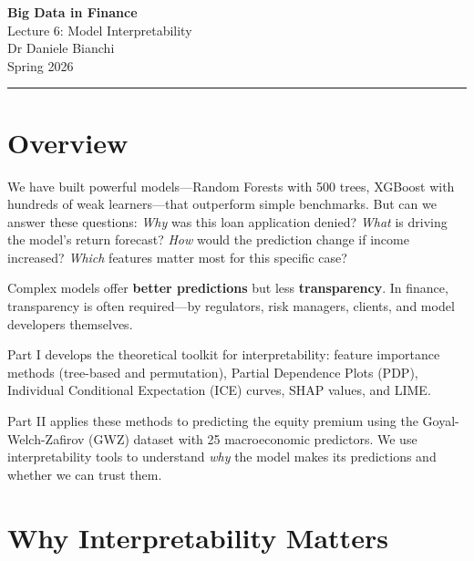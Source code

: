 \documentclass[11pt,a4paper]{article}
\newcommand{\keyword}[1]{\textbf{\textcolor{AccentOrange}{#1}}}
\begin{document}
\begin{center}
    {\LARGE\bfseries\textcolor{ThemeBlue}{Big Data in Finance}}\\[0.5em]
    {\Large Lecture 6: Model Interpretability}\\[1em]
    {\large Dr Daniele Bianchi}\\[0.5em]
    {\normalsize Spring 2026}
\end{center}

\vspace{1em}
\hrule
\vspace{1em}

\tableofcontents

\vspace{2cm}

\section*{Overview}

We have built powerful models---Random Forests with 500 trees, XGBoost with hundreds of weak learners---that outperform simple benchmarks. But can we answer these questions: \emph{Why} was this loan application denied? \emph{What} is driving the model's return forecast? \emph{How} would the prediction change if income increased? \emph{Which} features matter most for this specific case?

Complex models offer \keyword{better predictions} but less \keyword{transparency}. In finance, transparency is often required---by regulators, risk managers, clients, and model developers themselves.

Part I develops the theoretical toolkit for interpretability: feature importance methods (tree-based and permutation), Partial Dependence Plots (PDP), Individual Conditional Expectation (ICE) curves, SHAP values, and LIME.

Part II applies these methods to predicting the equity premium using the Goyal-Welch-Zafirov (GWZ) dataset with 25 macroeconomic predictors. We use interpretability tools to understand \emph{why} the model makes its predictions and whether we can trust them.

\section{Why Interpretability Matters}
\end{document}
